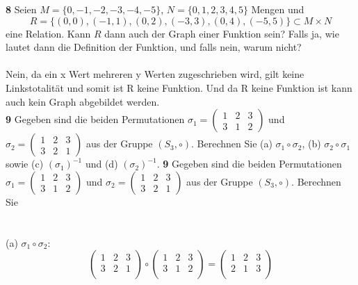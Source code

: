 \documentclass[11pt]{article}
\begin{document}
    \textbf{8} Seien \( M = \{0,-1,-2,-3,-4,-5\} \), \( N = \{0,1,2,3,4,5\} \) Mengen und
    \[ R = \{(0,0),(-1,1),(0,2),(-3,3),(0,4),(-5,5)\} \subset M \times N \]
    eine Relation. Kann \( R \) dann auch der Graph einer Funktion sein? Falls ja, wie lautet dann die Definition der Funktion, und falls nein, warum nicht?\\\\
    Nein, da ein x Wert mehreren y Werten zugeschrieben wird, gilt keine Linkstotalität und somit ist R keine Funktion. Und da R keine Funktion ist kann auch kein Graph abgebildet werden.\\

    \textbf{9} Gegeben sind die beiden Permutationen \(\sigma_{1} = \begin{pmatrix} 1 & 2 & 3 \\ 3 & 1 & 2 \end{pmatrix}\) und \(\sigma_{2} = \begin{pmatrix} 1 & 2 & 3 \\ 3 & 2 & 1 \end{pmatrix}\) aus der Gruppe \( (S_3, \circ) \). Berechnen Sie (a) \(\sigma_{1} \circ \sigma_{2}\), (b) \(\sigma_{2} \circ \sigma_{1}\) sowie (c) \((\sigma_{1})^{-1}\) und (d) \((\sigma_{2})^{-1}\).
\textbf{9} Gegeben sind die beiden Permutationen \(\sigma_{1} = \begin{pmatrix} 1 & 2 & 3 \\ 3 & 1 & 2 \end{pmatrix}\) und \(\sigma_{2} = \begin{pmatrix} 1 & 2 & 3 \\ 3 & 2 & 1 \end{pmatrix}\) aus der Gruppe \( (S_3, \circ) \). Berechnen Sie
\\\\\\
(a) \(\sigma_{1} \circ \sigma_{2}\):
    \[
        \begin{pmatrix}
            1 & 2 & 3 \\
            3 & 2 & 1 \\
        \end{pmatrix}
        \circ
        \begin{pmatrix}
            1 & 2 & 3 \\
            3 & 1 & 2 \\
        \end{pmatrix}
        =
        \begin{pmatrix}
            1 & 2 & 3 \\
            2 & 1 & 3 \\
        \end{pmatrix}
    \]
\end{document}
